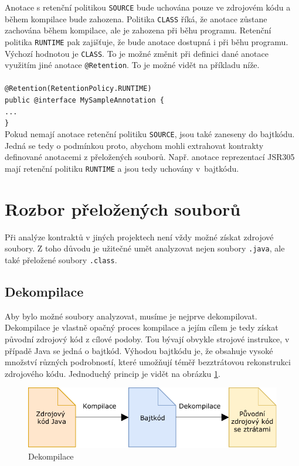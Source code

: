 				Anotace s retenční politikou \texttt{SOURCE} bude uchována pouze ve zdrojovém kódu a během kompilace bude zahozena. Politika \texttt{CLASS} říká, že anotace zůstane zachována během kompilace, ale je zahozena při běhu programu. Retenční politika \texttt{RUNTIME} pak zajišťuje, že bude anotace dostupná i při běhu programu. Výchozí hodnotou je \texttt{CLASS}. To je možné změnit při definici dané anotace využitím jiné anotace \texttt{@Retention}. To je možné vidět na příkladu níže.\\\\
				\- \- \- \- \- \- \texttt{@Retention(RetentionPolicy.RUNTIME)}\\
				\- \- \- \- \- \- \texttt{public @interface MySampleAnnotation \{}\\
				\- \- \- \- \- \- \- \- \- \texttt{...}\\
				\- \- \- \- \- \- \texttt{\}}\\

				Pokud nemají anotace retenční politiku \texttt{SOURCE}, jsou také zaneseny do bajtkódu. Jedná se tedy o podmínkou proto, abychom mohli extrahovat kontrakty definované anotacemi z přeložených souborů. Např. anotace reprezentací JSR305 mají retenční politiku \texttt{RUNTIME} a jsou tedy uchovány v~bajtkódu.
	
	\section{Rozbor přeložených souborů}
		Při analýze kontraktů v jiných projektech není vždy možné získat zdrojové soubory. Z toho důvodu je užitečné umět analyzovat nejen soubory \texttt{.java}, ale také přeložené soubory \texttt{.class}.
	
		\subsection{Dekompilace}
			Aby bylo možné soubory analyzovat, musíme je nejprve dekompilovat. Dekompilace je vlastně opačný proces kompilace a jejím cílem je tedy získat původní zdrojový kód z cílové podoby. Tou bývají obvykle strojové instrukce, v případě Java se jedná o bajtkód. Výhodou bajtkódu je, že obsahuje vysoké množství různých podrobností, které umožňují téměř bezztrátovou rekonstrukci zdrojového kódu. Jednoduchý princip je vidět na obrázku \ref{decompilation}.
			
			\begin{figure}[!htb]
					\centering
					\includegraphics{img/decompilation.pdf}
					\caption[decompilation]{Dekompilace}
					\label{decompilation}
				\endminipage\hfill
			\end{figure}
			
